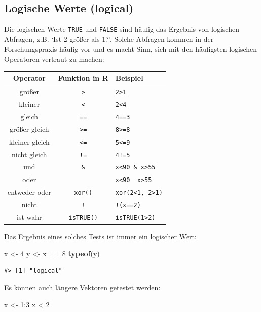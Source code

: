 \documentclass[]{tufte-book}
\newenvironment{Shaded}{}{}
\newcommand{\KeywordTok}[1]{\textcolor[rgb]{0.00,0.44,0.13}{\textbf{#1}}}
\newcommand{\DecValTok}[1]{\textcolor[rgb]{0.25,0.63,0.44}{#1}}
\newcommand{\StringTok}[1]{\textcolor[rgb]{0.25,0.44,0.63}{#1}}
\newcommand{\OperatorTok}[1]{\textcolor[rgb]{0.40,0.40,0.40}{#1}}
\newcommand{\NormalTok}[1]{#1}
\begin{document}
\subsection{Logische Werte (logical)}\label{logische-werte-logical}

Die logischen Werte \texttt{TRUE} und \texttt{FALSE} sind häufig das
Ergebnis von logischen Abfragen, z.B. `Ist 2 größer als 1?'. Solche
Abfragen kommen in der Forschungspraxis häufig vor und es macht Sinn,
sich mit den häufigsten logischen Operatoren vertraut zu machen:

\begin{longtable}[]{@{}ccl@{}}
\toprule
Operator & Funktion in R & Beispiel\tabularnewline
\midrule
\endhead
größer & \texttt{\textgreater{}} &
\texttt{2\textgreater{}1}\tabularnewline
kleiner & \texttt{\textless{}} & \texttt{2\textless{}4}\tabularnewline
gleich & \texttt{==} & \texttt{4==3}\tabularnewline
größer gleich & \texttt{\textgreater{}=} &
\texttt{8\textgreater{}=8}\tabularnewline
kleiner gleich & \texttt{\textless{}=} &
\texttt{5\textless{}=9}\tabularnewline
nicht gleich & \texttt{!=} & \texttt{4!=5}\tabularnewline
und & \texttt{\&} &
\texttt{x\textless{}90\ \&\ x\textgreater{}55}\tabularnewline
oder & \texttt{\textbar{}} &
\texttt{x\textless{}90\ \textbar{}\ x\textgreater{}55}\tabularnewline
entweder oder & \texttt{xor()} &
\texttt{xor(2\textless{}1,\ 2\textgreater{}1)}\tabularnewline
nicht & \texttt{!} & \texttt{!(x==2)}\tabularnewline
ist wahr & \texttt{isTRUE()} &
\texttt{isTRUE(1\textgreater{}2)}\tabularnewline
\bottomrule
\end{longtable}

Das Ergebnis eines solches Tests ist immer ein logischer Wert:

\begin{Shaded}
\begin{Highlighting}[]
\NormalTok{x <-}\StringTok{ }\DecValTok{4}
\NormalTok{y <-}\StringTok{ }\NormalTok{x }\OperatorTok{==}\StringTok{ }\DecValTok{8}
\KeywordTok{typeof}\NormalTok{(y)}
\end{Highlighting}
\end{Shaded}

\begin{verbatim}
#> [1] "logical"
\end{verbatim}

Es können auch längere Vektoren getestet werden:

\begin{Shaded}
\begin{Highlighting}[]
\NormalTok{x <-}\StringTok{ }\DecValTok{1}\OperatorTok{:}\DecValTok{3}
\NormalTok{x }\OperatorTok{<}\StringTok{ }\DecValTok{2}
\end{Highlighting}
\end{Shaded}
\end{document}
